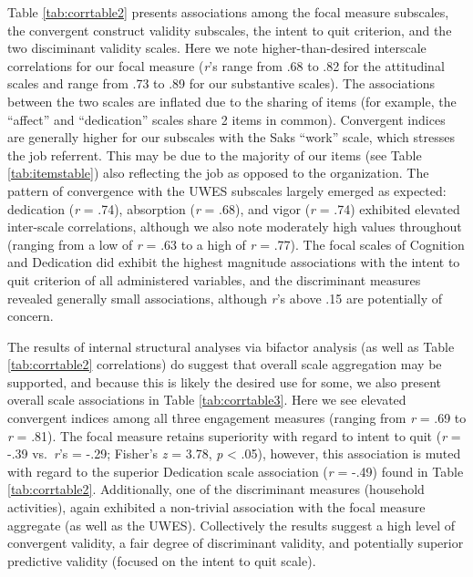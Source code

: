 \documentclass[
  man]{apa6}
\begin{document}
Table \ref{tab:corrtable2} presents associations among the focal measure subscales, the convergent construct validity subscales, the intent to quit criterion, and the two disciminant validity scales. Here we note higher-than-desired interscale correlations for our focal measure (\emph{r}'s range from .68 to .82 for the attitudinal scales and range from .73 to .89 for our substantive scales). The associations between the two scales are inflated due to the sharing of items (for example, the ``affect'' and ``dedication'' scales share 2 items in common). Convergent indices are generally higher for our subscales with the Saks ``work'' scale, which stresses the job referrent. This may be due to the majority of our items (see Table \ref{tab:itemstable}) also reflecting the job as opposed to the organization. The pattern of convergence with the UWES subscales largely emerged as expected: dedication (\emph{r} = .74), absorption (\emph{r} = .68), and vigor (\emph{r} = .74) exhibited elevated inter-scale correlations, although we also note moderately high values throughout (ranging from a low of \emph{r} = .63 to a high of \emph{r} = .77). The focal scales of Cognition and Dedication did exhibit the highest magnitude associations with the intent to quit criterion of all administered variables, and the discriminant measures revealed generally small associations, although \emph{r}'s above .15 are potentially of concern.

The results of internal structural analyses via bifactor analysis (as well as Table \ref{tab:corrtable2} correlations) do suggest that overall scale aggregation may be supported, and because this is likely the desired use for some, we also present overall scale associations in Table \ref{tab:corrtable3}. Here we see elevated convergent indices among all three engagement measures (ranging from \emph{r} = .69 to \emph{r} = .81). The focal measure retains superiority with regard to intent to quit (\emph{r} = -.39 vs.~\emph{r}'s = -.29; Fisher's \emph{z} = 3.78, \emph{p} \textless{} .05), however, this association is muted with regard to the superior Dedication scale association (\emph{r} = -.49) found in Table \ref{tab:corrtable2}. Additionally, one of the discriminant measures (household activities), again exhibited a non-trivial association with the focal measure aggregate (as well as the UWES). Collectively the results suggest a high level of convergent validity, a fair degree of discriminant validity, and potentially superior predictive validity (focused on the intent to quit scale).
\end{document}
